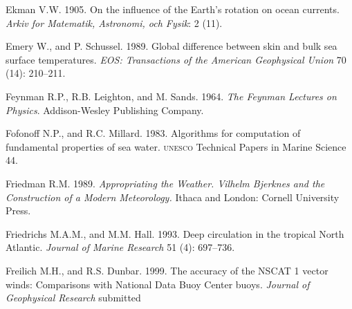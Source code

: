 \begin{thebibliography}{999}
Ekman V.W.  1905. On the influence of the Earth's rotation on ocean
currents. \textit{Arkiv for Matematik, Astronomi, och Fysik}: 2 (11).
%

Emery W., and P. Schussel.  1989. Global difference between skin and
bulk sea surface temperatures. \textit{EOS: Transactions of the
  American Geophysical Union} 70 (14): 210--211.
%

Feynman R.P., R.B. Leighton, and M. Sands.  1964. \textit{The Feynman
  Lectures on Physics}.  Addison-Wesley Publishing Company.
%

Fofonoff N.P., and R.C. Millard.  1983. Algorithms for computation of
fundamental properties of sea water. \textsc{unesco} Technical Papers
in Marine Science 44.
%

Friedman R.M.  1989. \textit{Appropriating the Weather. Vilhelm
  Bjerknes and the Construction of a Modern Meteorology.}  Ithaca and
London: Cornell University Press.
%

Friedrichs M.A.M., and M.M. Hall.  1993. Deep circulation in the
tropical North Atlantic. \textit{Journal of Marine Research} 51 (4):
697--736.
%

Freilich M.H., and R.S. Dunbar.  1999. The accuracy of the NSCAT 1
vector winds: Comparisons with National Data Buoy Center
buoys. \textit{Journal of Geophysical Research} submitted
%


\end{thebibliography}

